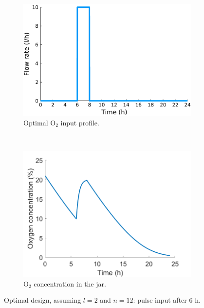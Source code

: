 \begin{figure}
	\centering
	\begin{subfigure}[b]{0.45\textwidth}
		\includegraphics[width=\textwidth]{figure/paper 1/extra1}
		\caption{Optimal $\text{O}_2$ input profile.}
		\label{input1}
	\end{subfigure}
	~ %
	\begin{subfigure}[b]{0.45\textwidth}
		\includegraphics[width=\textwidth]{figure/paper 1/design.png}
		\caption{$\text{O}_2$ concentration in the jar.}
		\label{output1}
	\end{subfigure}
	\caption{Optimal design, assuming $l=2$ and $n=12$: pulse input after $6 \text{ h}$.}
	\label{figODE1}
\end{figure}
